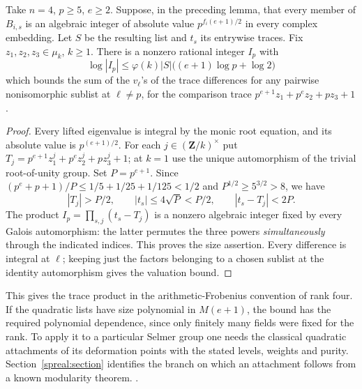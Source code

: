 \begin{corollary}\label{rk4:integer}
Take \(n=4\), \(p\ge5\), \(e\ge2\). Suppose, in the preceding lemma,
that every member of \(B_{i,s}\) is an algebraic integer of absolute
value \(p^{f_i(e+1)/2}\) in every complex embedding. Let \(S\) be
the resulting list and \(t_s\) its entrywise traces. Fix
\(z_1,z_2,z_3\in\mu_k\), \(k\ge1\). There is a nonzero rational
integer \(I_p\) with
\[
 \log|I_p|\le\varphi(k)|S|\bigl((e+1)\log p+\log 2\bigr)
\]
which bounds the sum of the \(v_\ell\)'s of the trace differences for
any pairwise nonisomorphic sublist at \(\ell\ne p\), for the comparison
trace \(p^{e+1}z_1+p^e z_2+pz_3+1\).
\end{corollary}
\begin{proof}
Every lifted eigenvalue is integral by the monic root equation,
and its absolute value is \(p^{(e+1)/2}\). For each
\(j\in(\mathbf Z/k)^\times\) put \(T_j=p^{e+1}z_1^j+p^ez_2^j+pz_3^j+1\);
at \(k=1\) use the unique automorphism of the trivial root-of-unity
group. Set \(P=p^{e+1}\). Since \((p^e+p+1)/P\le1/5+1/25+1/125<1/2\)
and \(P^{1/2}\ge5^{3/2}>8\), we have
\[
 |T_j|>P/2,\qquad |t_s|\le4\sqrt P<P/2,\qquad |t_s-T_j|<2P.
\]
The product \(I_p=\prod_{s,j}(t_s-T_j)\) is a nonzero algebraic
integer fixed by every Galois automorphism: the latter permutes the
three powers \emph{simultaneously} through the indicated indices.
This proves the size assertion. Every difference is integral at
\(\ell\); keeping just the factors belonging to a chosen sublist at
the identity automorphism gives the valuation bound.
\end{proof}
This gives the trace product in the arithmetic-Frobenius convention
of rank four. If the quadratic lists have size polynomial in \(M(e+1)\),
the bound has the required polynomial dependence, since only finitely
many fields were fixed for the rank. To apply it to a particular
Selmer group one needs the classical quadratic attachments of its
deformation points with the stated levels, weights and purity.
Section~\ref{spreal:section} identifies the branch on which an
attachment follows from a known modularity theorem. .
